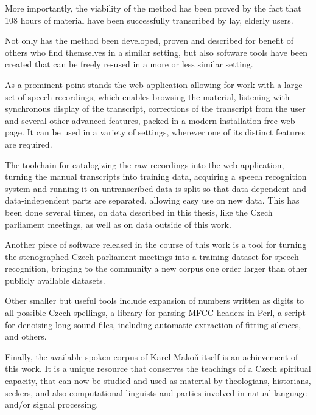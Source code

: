 \documentclass[12pt,a4paper]{report}
\begin{document}
More importantly, the viability of the method has been proved by the fact that
108 hours of material have been successfully transcribed by lay, elderly users.

Not only has the method been developed, proven and described for benefit of
others who find themselves in a similar setting, but also software tools have
been created that can be freely re-used in a more or less similar setting.

As a
prominent point stands the web application allowing for work with a large set of
speech recordings, which enables browsing the material, listening with
synchronous display of the transcript, corrections of the transcript from the
user and several other advanced features, packed in a modern installation-free
web page.
It can be used in a variety of settings, wherever one of its distinct features
are required.

The toolchain for catalogizing the raw recordings into the web application,
turning the manual transcripts into training data, acquiring a speech
recognition system and running it on untranscribed data is split so
that data-dependent and data-independent parts are separated, allowing easy use
on new data. This has been done several times, on data described in this thesis,
like the Czech parliament meetings, as well as on data outside of this work.

Another piece of software released in the course of this work is a tool for
turning the stenographed Czech parliament meetings into a training dataset for
speech recognition, bringing to the community a new corpus one order larger than other publicly
available datasets.

Other smaller but useful tools include expansion of numbers written as digits to
all possible Czech spellings, a library for parsing MFCC headers in Perl, a
script for denoising long sound files, including automatic extraction of
fitting silences, and others.

Finally, the available spoken corpus of Karel Makoň itself is an achievement of
this work. It is a unique resource that conserves the teachings of a Czech
spiritual capacity, that can now be studied and used as material by theologians,
historians, seekers, and also computational linguists and parties involved in
natual language and/or signal processing.

\renewcommand{\bibname}{References}


\end{document}
